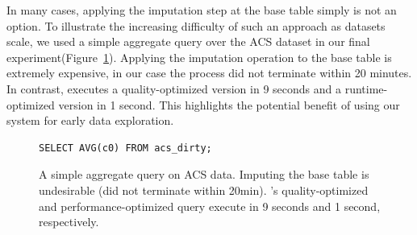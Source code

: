 In many cases, applying the imputation step at the base table simply is not an option. To illustrate the increasing difficulty of such an approach
as datasets scale, we used a simple aggregate query over the ACS dataset in our final experiment(Figure~\ref{query-acs}). Applying the imputation operation to the base table
is extremely expensive, in our case the process did not terminate within 20 minutes. In contrast, \ProjectName{} executes a quality-optimized version
in 9 seconds and a runtime-optimized version in 1 second. This highlights the potential benefit of using our system for early data exploration.

\begin{figure}
\begin{lstlisting}
SELECT AVG(c0) FROM acs_dirty;
\end{lstlisting}
\caption{A simple aggregate query on ACS data. Imputing the base table is undesirable (did not terminate within 20min). \ProjectName's
quality-optimized and performance-optimized query execute in 9 seconds and 1 second, respectively.
}%
\label{query-acs}
\end{figure}


